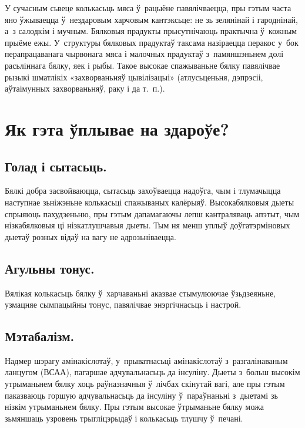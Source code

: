 
У сучасным сьвеце колькасьць мяса ў~рацыёне павялічваецца, пры гэтым часта яно ўжываецца ў~нездаровым харчовым кантэксьце: не зь зелянінай і гароднінай, а~з салодкім і мучным. Бялковыя прадукты прысутнічаюць практычна ў~кожным прыёме ежы. У~структуры бялковых прадуктаў таксама назіраецца перакос у~бок перапрацаванага чырвонага мяса і малочных прадуктаў з~памяншэньнем долі расьліннага бялку, яек і рыбы. Такое высокае спажываньне бялку павялічвае рызыкі шматлікіх «захворваньняў цывілізацыі» (атлусьценьня, дэпрэсіі, аўтаімунных захворваньняў, раку і да т.~п.).

\section{Як гэта ўплывае на здароўе?}

\subsection{Голад і сытасьць.}
Бялкі добра засвойваюцца, сытасьць захоўваецца надоўга, чым і тлумачыцца наступнае зьніжэньне колькасьці спажываных калёрыяў. Высокабялковыя дыеты спрыяюць пахудзеньню, пры гэтым дапамагаючы лепш кантраляваць апэтыт, чым нізкабялковыя ці нізкатлушчавыя дыеты. Тым ня менш уплыў доўгатэрміновых дыетаў розных відаў на вагу не адрозьніваецца.

\subsection{Агульны тонус.}
Вялікая колькасьць бялку ў~харчаваньні аказвае стымулюючае ўзьдзеяньне, узмацняе сымпацыйны тонус, павялічвае энэргічнасьць і настрой.

\subsection{Мэтабалізм.}
Надмер шэрагу амінакіслотаў, у~прыватнасьці амінакіслотаў з~разгалінаваным ланцугом (ВСАА), пагаршае адчувальнасьць да інсуліну. Дыеты з~больш высокім утрыманьнем бялку хоць раўназначныя ў~лічбах скінутай вагі, але пры гэтым паказваюць горшую адчувальнасьць да інсуліну ў~параўнаньні з~дыетамі зь нізкім утрыманьнем бялку. Пры гэтым высокае ўтрыманьне бялку можа зьмяншаць узровень трыгліцэрыдаў і колькасьць тлушчу ў~печані.

